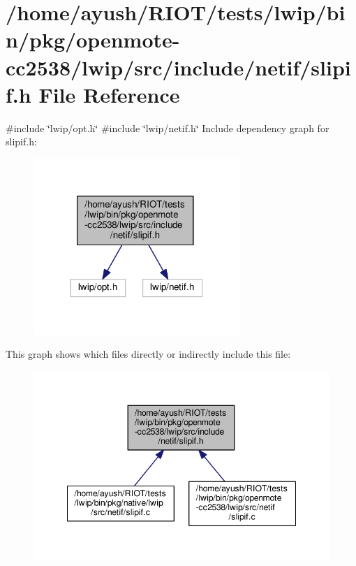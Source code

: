 \hypertarget{openmote-cc2538_2lwip_2src_2include_2netif_2slipif_8h}{}\section{/home/ayush/\+R\+I\+O\+T/tests/lwip/bin/pkg/openmote-\/cc2538/lwip/src/include/netif/slipif.h File Reference}
\label{openmote-cc2538_2lwip_2src_2include_2netif_2slipif_8h}
{\ttfamily \#include \char`\"{}lwip/opt.\+h\char`\"{}}\newline
{\ttfamily \#include \char`\"{}lwip/netif.\+h\char`\"{}}\newline
Include dependency graph for slipif.\+h\+:
\nopagebreak
\begin{figure}[H]
\begin{center}
\leavevmode
\includegraphics[width=222pt]{openmote-cc2538_2lwip_2src_2include_2netif_2slipif_8h__incl}
\end{center}
\end{figure}
This graph shows which files directly or indirectly include this file\+:
\nopagebreak
\begin{figure}[H]
\begin{center}
\leavevmode
\includegraphics[width=348pt]{openmote-cc2538_2lwip_2src_2include_2netif_2slipif_8h__dep__incl}
\end{center}
\end{figure}
